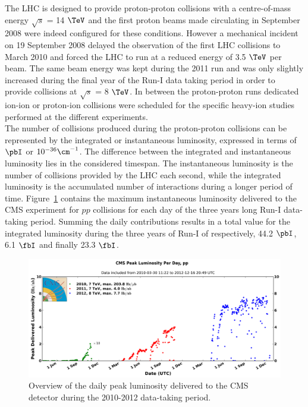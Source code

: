 The LHC is  designed to provide proton-proton collisions with a centre-of-mass energy $\sqrt{s}$ = 14 $\TeV$ and the first proton beams made circulating in September 2008 were indeed configured for these conditions. However a mechanical incident on 19 September 2008 delayed the observation of the first LHC collisions to March 2010 and forced the LHC to run at a reduced energy of 3.5 $\TeV$ per beam. The same beam energy was kept during the 2011 run and was only slightly increased during the final year of the Run-I data taking period in order to provide collisions at $\sqrt{s}$ = 8 $\TeV$. In between the proton-proton runs dedicated ion-ion or proton-ion collisions were scheduled for the specific heavy-ion studies performed at the different experiments.
\\
The number of collisions produced during the proton-proton collisions can be represented by the integrated or instantaneous luminosity, expressed in terms of $\pbI$ or $10^{-36} \cm^{-1}$. The difference between the integrated and instantaneous luminosity lies in the considered timespan. The instantaneous luminosity is the number of collisions provided by the LHC each second, while the integrated luminosity is the accumulated number of interactions during a longer period of time. Figure~\ref{fig::InstLumi} contains the maximum instantaneous luminosity delivered to the CMS experiment for $pp$ collisions for each day of the three years long Run-I data-taking period.
Summing the daily contributions results in a total value for the integrated luminosity during the three years of Run-I of respectively, 44.2 $\pbI$, 6.1 $\fbI$ and finally 23.3 $\fbI$.
\begin{figure}[h!t]
 \centering
 \includegraphics[width = 0.95 \textwidth]{Chapters/Chapter2_CERN/Figures/InstanteneousLumi_FullRunI.png}
 \caption{Overview of the daily peak luminosity delivered to the CMS detector during the 2010-2012 data-taking period.} 
 \label{fig::InstLumi}
\end{figure}

